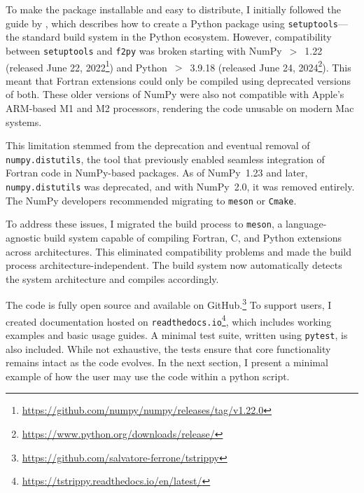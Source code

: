     To make the package installable and easy to distribute, I initially followed the guide by \citet{pythonpackagingguide}, which describes how to create a Python package using \texttt{setuptools}—the standard build system in the Python ecosystem. However, compatibility between \texttt{setuptools} and \texttt{f2py} was broken starting with NumPy~$>$~1.22 (released June 22, 2022\footnote{\url{https://github.com/numpy/numpy/releases/tag/v1.22.0}}) and Python~$>$~3.9.18 (released June 24, 2024\footnote{\url{https://www.python.org/downloads/release/}}). This meant that Fortran extensions could only be compiled using deprecated versions of both. These older versions of NumPy were also not compatible with Apple's ARM-based M1 and M2 processors, rendering the code unusable on modern Mac systems.

    This limitation stemmed from the deprecation and eventual removal of \texttt{numpy.distutils}, the tool that previously enabled seamless integration of Fortran code in NumPy-based packages. As of NumPy~1.23 and later, \texttt{numpy.distutils} was deprecated, and with NumPy~2.0, it was removed entirely. The NumPy developers recommended migrating to \texttt{meson} \citep{meson_manual} or \texttt{Cmake}.

    To address these issues, I migrated the build process to \texttt{meson}, a language-agnostic build system capable of compiling Fortran, C, and Python extensions across architectures. This eliminated compatibility problems and made the build process architecture-independent. The build system now automatically detects the system architecture and compiles accordingly.

    The code is fully open source and available on GitHub.\footnote{\url{https://github.com/salvatore-ferrone/tstrippy}} To support users, I created documentation hosted on \texttt{readthedocs.io}\footnote{\url{https://tstrippy.readthedocs.io/en/latest/}}, which includes working examples and basic usage guides. A minimal test suite, written using \texttt{pytest}, is also included. While not exhaustive, the tests ensure that core functionality remains intact as the code evolves. In the next section, I present a minimal example of how the user may use the code within a python script.

